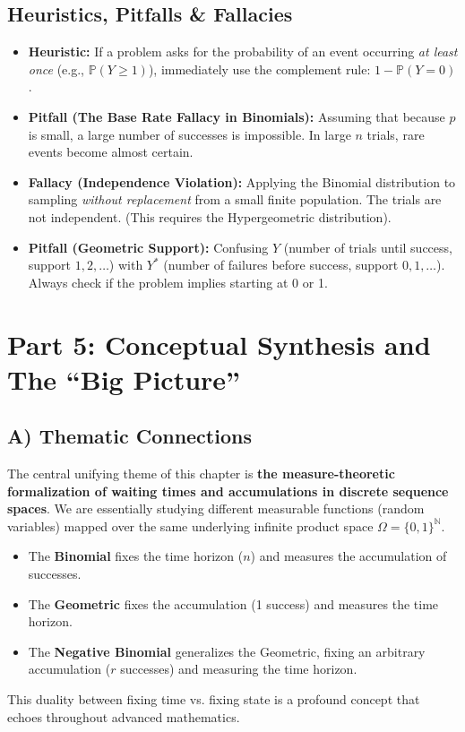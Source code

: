 \documentclass[11pt, letterpaper]{article}
\theoremstyle{definition}
\theoremstyle{remark}
\newcommand{\Prob}{\mathbb{P}}
\newcommand{\N}{\mathbb{N}}
\begin{document}
\subsection{Heuristics, Pitfalls \& Fallacies}
\begin{itemize}
    \item \textbf{Heuristic:} If a problem asks for the probability of an event occurring \textit{at least once} (e.g., $\Prob(Y \ge 1)$), immediately use the complement rule: $1 - \Prob(Y = 0)$.
    \item \textbf{Pitfall (The Base Rate Fallacy in Binomials):} Assuming that because $p$ is small, a large number of successes is impossible. In large $n$ trials, rare events become almost certain.
    \item \textbf{Fallacy (Independence Violation):} Applying the Binomial distribution to sampling \textit{without replacement} from a small finite population. The trials are not independent. (This requires the Hypergeometric distribution).
    \item \textbf{Pitfall (Geometric Support):} Confusing $Y$ (number of trials until success, support $1, 2, \dots$) with $Y^*$ (number of failures before success, support $0, 1, \dots$). Always check if the problem implies starting at 0 or 1.
\end{itemize}

\newpage

\section{Part 5: Conceptual Synthesis and The ``Big Picture''}

\subsection{A) Thematic Connections}
The central unifying theme of this chapter is \textbf{the measure-theoretic formalization of waiting times and accumulations in discrete sequence spaces}. We are essentially studying different measurable functions (random variables) mapped over the same underlying infinite product space $\Omega = \{0, 1\}^\N$. 
\begin{itemize}
    \item The \textbf{Binomial} fixes the time horizon ($n$) and measures the accumulation of successes.
    \item The \textbf{Geometric} fixes the accumulation (1 success) and measures the time horizon.
    \item The \textbf{Negative Binomial} generalizes the Geometric, fixing an arbitrary accumulation ($r$ successes) and measuring the time horizon.
\end{itemize}
This duality between fixing time vs. fixing state is a profound concept that echoes throughout advanced mathematics.
\end{document}
